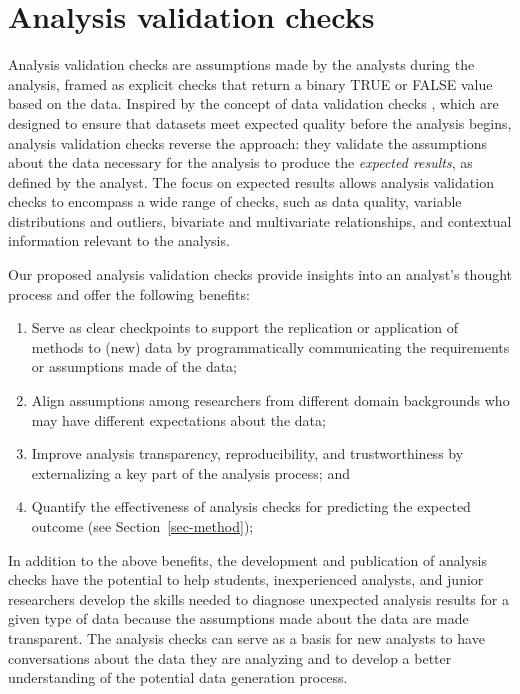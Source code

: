 \documentclass[
  12pt,
]{interact}
\providecommand{\tightlist}{%
  \setlength{\itemsep}{0pt}\setlength{\parskip}{0pt}}\usepackage{longtable,booktabs,array}
\begin{document}
\section{Analysis validation checks}\label{sec-plan}

Analysis validation checks are assumptions made by the analysts during
the analysis, framed as explicit checks that return a binary TRUE or
FALSE value based on the data. Inspired by the concept of data
validation checks \citep{validate}, which are designed to ensure that
datasets meet expected quality before the analysis begins, analysis
validation checks reverse the approach: they validate the assumptions
about the data necessary for the analysis to produce the \emph{expected
results}, as defined by the analyst. The focus on expected results
allows analysis validation checks to encompass a wide range of checks,
such as data quality, variable distributions and outliers, bivariate and
multivariate relationships, and contextual information relevant to the
analysis.

Our proposed analysis validation checks provide insights into an
analyst's thought process and offer the following benefits:

\begin{enumerate}
\def\labelenumi{\arabic{enumi}.}
\tightlist
\item
  Serve as clear checkpoints to support the replication or application
  of methods to (new) data by programmatically communicating the
  requirements or assumptions made of the data;
\item
  Align assumptions among researchers from different domain backgrounds
  who may have different expectations about the data;
\item
  Improve analysis transparency, reproducibility, and trustworthiness by
  externalizing a key part of the analysis process; and
\item
  Quantify the effectiveness of analysis checks for predicting the
  expected outcome (see Section~\ref{sec-method});
\end{enumerate}

In addition to the above benefits, the development and publication of
analysis checks have the potential to help students, inexperienced
analysts, and junior researchers develop the skills needed to diagnose
unexpected analysis results for a given type of data because the
assumptions made about the data are made transparent. The analysis
checks can serve as a basis for new analysts to have conversations about
the data they are analyzing and to develop a better understanding of the
potential data generation process.
\end{document}
